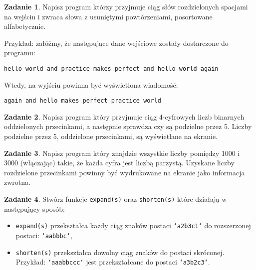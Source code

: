 \documentclass[11pt]{article}
\theoremstyle{definition}
\newtheorem{zadanie}{Zadanie}
\begin{document}
\begin{zadanie}
Napisz program którzy przyjmuje ciąg słów rozdzielonych spacjami na wejściu i zwraca słowa z usuniętymi powtórzeniami, posortowane alfabetycznie.

Przykład: załóżmy, że następujące dane wejściowe zostały dostarczone do programu:
\begin{verbatim}
hello world and practice makes perfect and hello world again
\end{verbatim}
Wtedy, na wyjściu powinna być wyświetlona wiadomość:
\begin{verbatim}
again and hello makes perfect practice world
\end{verbatim}
\end{zadanie}
\begin{zadanie}
Napisz program który przyjmuje ciąg 4-cyfrowych liczb binarnych oddzielonych przecinkami, a następnie sprawdza czy są podzielne przez 5. Liczby podzielne przez 5, oddzielone przecinkami, są wyświetlane na ekranie.
\end{zadanie}
\begin{zadanie}
Napisz program który znajdzie wszystkie liczby pomiędzy 1000 i 3000 (włączając) takie, że każda cyfra jest liczbą parzystą. Uzyskane liczby rozdzielone przecinkami powinny być wydrukowane na ekranie jako informacja zwrotna.
\end{zadanie}

\begin{zadanie}
Stwórz funkcje \texttt{expand(s)} oraz \texttt{shorten(s)} które działają w następujący sposób:

\begin{itemize}
\item \texttt{expand(s)} przekształca każdy ciąg znaków postaci \texttt{`a2b3c1`} do rozszerzonej postaci: \texttt{`aabbbc`},
\item \texttt{shorten(s)} przekształca dowolny ciąg znaków do postaci skróconej. Przykład: \texttt{`aaabbccc`} jest przekształcane do postaci \texttt{`a3b2c3`}.
\end{itemize}

\end{zadanie}
\end{document}
